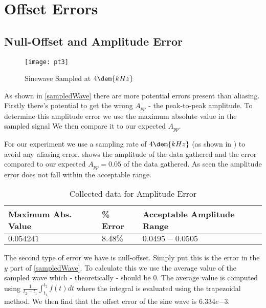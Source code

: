 \documentclass[main.tex]{subfile}
\begin{document}
\section{Offset Errors} 
\label{sec:nyquist_frequency}

\subsection{Null-Offset and Amplitude Error}
\label{sec:amplitude_error}

\begin{figure}[H]
	\begin{center}
		\texttt{[image: pt3]}
	\end{center}
	\caption{Sinewave Sampled at $4\dem{kHz}$}
	\label{fig:4korig}
\end{figure}

As shown in \eqref{sampledWave} there are more potential errors present than
aliasing. Firstly there's potential to get the wrong $A_{pp}$ - the
peak-to-peak amplitude. To determine this amplitude error we use the maximum
absolute value in the sampled signal We then compare it to our expected
$A_{pp}$. 

For our experiment we use a sampling rate of $4\dem{kHz}$ (as shown in
) to avoid any aliasing error.  shows the
amplitude of the data gathered and the error compared to our expected $A_{pp} =
0.05$ of the data gathered. As seen the amplitude error does not fall within the
acceptable range.

\begin{table}[H]
  \begin{center}
    \caption{Collected data for Amplitude Error}
    \label{tab:ampError}
    \begin{tabular}{lll}
      \\ \toprule
      Maximum Abs. Value & \% Error  & Acceptable Amplitude Range
      \\ \midrule
      $0.054241$ & $8.48\%$ & $0.0495 - 0.0505$
      \\ \bottomrule
    \end{tabular}
  \end{center}
\end{table}

The second type of error we have is null-offset. Simply put this is the error in
the $y$ part of \eqref{sampledWave}. To calculate this we use the average value
of the sampled wave which - theoretically - should be $0$. The average value is
computed using $\frac{1}{t_2-t_1}\int_{t_1}^{t_2}{f(t) dt}$ where the integral
is evaluated using the trapezoidal method. We then find that the offset error of
the sine wave is $6.334e{-3}$.
\end{document}
